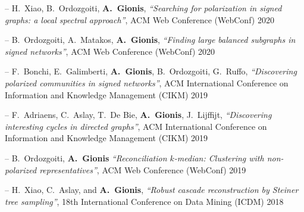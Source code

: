 \documentclass[a4paper,11pt]{article}
\begin{document}
\item[--] 
{H.\ Xiao, B.\ Ordozgoiti, \textbf{A.\ Gionis}},
{\em ``Searching for polarization in signed graphs: a local spectral approach''},
ACM Web Conference (WebConf) 2020

\item[--] 
{B.\ Ordozgoiti, A.\ Matakos, \textbf{A.\ Gionis}},
{\em ``Finding large balanced subgraphs in signed networks''},
ACM Web Conference (WebConf) 2020

\item[--] 
{F.\ Bonchi, E.\ Galimberti, \textbf{A.\ Gionis}, B.\ Ordozgoiti, G.\ Ruffo},
{\em ``Discovering polarized communities in signed networks''},
ACM International Conference on Information and Knowledge Management (CIKM) 2019

\item[--] 
{F.\ Adriaens, C.\ Aslay, T.\ De Bie, \textbf{A.\ Gionis}, J.\ Lijffijt},
{\em ``Discovering interesting cycles in directed graphs''},
ACM International Conference on Information and Knowledge Management (CIKM) 2019

\item[--] 
{B.\ Ordozgoiti, \textbf{A.\ Gionis}}
{\em ``Reconciliation $k$-median: Clustering with non-polarized representatives''},
ACM Web Conference (WebConf) 2019


\item[--] 
{H.\ Xiao, C.\ Aslay, and \textbf{A.\ Gionis}}, 
{\em ``Robust cascade reconstruction by Steiner tree sampling''}, 
18th International Conference on Data Mining (ICDM) 2018


\end{document}

